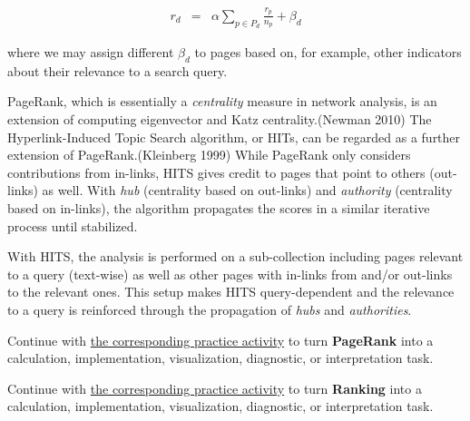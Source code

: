 \documentclass[
  letterpaper,
]{scrbook}
\begin{document}
\[\begin{aligned}
r_d & = & \alpha \sum_{p \in P_d} \frac{r_p}{n_p} + \beta_d
\end{aligned}\]

where we may assign different \(\beta_d\) to pages based on, for
example, other indicators about their relevance to a search query.

PageRank, which is essentially a \emph{centrality} measure in network
analysis, is an extension of computing eigenvector and Katz
centrality.(Newman 2010) The Hyperlink-Induced Topic Search algorithm,
or HITs, can be regarded as a further extension of PageRank.(Kleinberg
1999) While PageRank only considers contributions from in-links, HITS
gives credit to pages that point to others (out-links) as well. With
\emph{hub} (centrality based on out-links) and \emph{authority}
(centrality based on in-links), the algorithm propagates the scores in a
similar iterative process until stabilized.

With HITS, the analysis is performed on a sub-collection including pages
relevant to a query (text-wise) as well as other pages with in-links
from and/or out-links to the relevant ones. This setup makes HITS
query-dependent and the relevance to a query is reinforced through the
propagation of \emph{hubs} and \emph{authorities}.

\begin{tcolorbox}[enhanced jigsaw, arc=.35mm, bottomrule=.15mm, bottomtitle=1mm, breakable, colback=white, colbacktitle=quarto-callout-tip-color!10!white, colframe=quarto-callout-tip-color-frame, coltitle=black, left=2mm, leftrule=.75mm, opacityback=0, opacitybacktitle=0.6, rightrule=.15mm, title=\textcolor{quarto-callout-tip-color}{\faLightbulb}\hspace{0.5em}{Put it into practice}, titlerule=0mm, toprule=.15mm, toptitle=1mm]

Continue with \hyperref[sec-pr-12-pagerank]{the corresponding practice
activity} to turn \textbf{PageRank} into a calculation, implementation,
visualization, diagnostic, or interpretation task.

\end{tcolorbox}

\begin{tcolorbox}[enhanced jigsaw, arc=.35mm, bottomrule=.15mm, bottomtitle=1mm, breakable, colback=white, colbacktitle=quarto-callout-tip-color!10!white, colframe=quarto-callout-tip-color-frame, coltitle=black, left=2mm, leftrule=.75mm, opacityback=0, opacitybacktitle=0.6, rightrule=.15mm, title=\textcolor{quarto-callout-tip-color}{\faLightbulb}\hspace{0.5em}{Put it into practice}, titlerule=0mm, toprule=.15mm, toptitle=1mm]

Continue with \hyperref[sec-pr-12-ranking]{the corresponding practice
activity} to turn \textbf{Ranking} into a calculation, implementation,
visualization, diagnostic, or interpretation task.

\end{tcolorbox}
\end{document}
